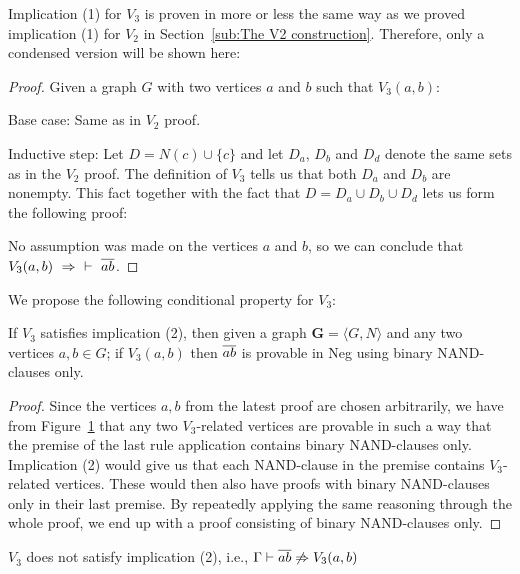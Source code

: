 Implication (1) for $V_3$ is proven in more or less the same way as we proved implication (1) for $V_2$ in Section~\ref{sub:The V2 construction}.
Therefore, only a condensed version will be shown here:
\begin{proof}
  Given a graph $G$ with two vertices $a$ and $b$ such that $V_3(a,b)$:

  Base case: Same as in $V_2$ proof.

  Inductive step: Let $D = N(c) \cup \{ c \}$ and let $D_a$, $D_b$ and $D_d$ denote the same sets as in the $V_2$ proof.
  The definition of $V_3$ tells us that both $D_a$ and $D_b$ are nonempty.
  This fact together with the fact that $D = D_a \cup D_b \cup D_d$ lets us form the following proof:\par
  \begin{figure}[!h]
    \centering
    \begin{prooftree*}
    \end{prooftree*}
    \caption{}
    \label{fig:proof_v3}
  \end{figure}
  No assumption was made on the vertices $a$ and $b$, so we can conclude that $V_3(a,b)~\Rightarrow~\;\vdash~\ol{ab}$.
\end{proof}
We propose the following conditional property for $V_3$:
\begin{lemma}
  If $V_3$ satisfies implication (2), then given a graph $\mathbf{G} = \langle G,N \rangle$ and any two vertices $a,b \in G$;
  if $V_3(a,b)$ then $\ol{ab}$ is provable in Neg using binary NAND-clauses only.
\end{lemma}
\begin{proof}
  Since the vertices $a,b$ from the latest proof are chosen arbitrarily, we have from Figure~\ref{fig:proof_v3} that any two $V_3$-related vertices are provable in such a way that the premise of the last rule application contains binary NAND-clauses only.
  Implication (2) would give us that each NAND-clause in the premise contains $V_3$-related vertices.
  These would then also have proofs with binary NAND-clauses only in their last premise.
  By repeatedly applying the same reasoning through the whole proof, we end up with a proof consisting of binary NAND-clauses only.
\end{proof}
\begin{lemma}
  $V_3$ does not satisfy implication (2), i.e., $\Gamma \vdash \ol{ab} \not \Rightarrow V_3(a,b)$
\end{lemma}
